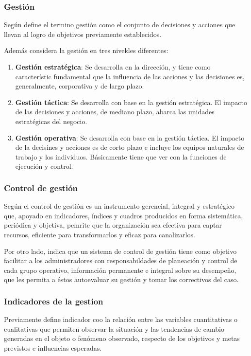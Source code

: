 \subsubsection{Gesti\'on}
Seg\'un \cite{beltran} define el termino gesti\'on como el conjunto de decisiones
y acciones que llevan al logro de objetivos previamente establecidos.

Adem\'as \cite{beltran} considera la gesti\'on en tres nivekles diferentes:
\begin{enumerate}
    \item \textbf{Gesti\'on estrat\'egica}: Se desarrolla en la direcci\'on, y tiene como
          caracter\'istic fundamental que la influencia de las acciones y las decisiones
          es, generalmente, corporativa y de largo plazo.
    \item \textbf{Gesti\'on t\'actica}: Se desarrolla con base en la gesti\'on
          estrat\'egica. El impacto de las decisiones y acciones, de mediano plazo,
          abarca las unidades estrat\'egicas del negocio.
    \item \textbf{Gesti\'on operativa}: Se desarrolla con base en la gesti\'on
          t\'actica. El impacto de la decisines y acciones es de corto plazo e incluye
          los equipos naturales de trabajo y los individuos. B\'asicamente tiene
          que ver con la funciones de ejecuci\'on y control.
\end{enumerate}
\subsubsection{Control de gesti\'on}
Seg\'un \cite{beltran} el control de gesti\'on es un instrumento gerencial, integral
y estrat\'egico que, apoyado en indicadores, \'indices y cuadros producidos en forma
sistem\'atica, peri\'odica y objetiva, pemrite que la organizaci\'on sea efectiva para
captar recursos, eficiente para transformarlos y eficaz para canalizarlos.

Por otro lado, \cite{beltran} indica que un sistema de control de gesti\'on tiene
como objetivo facilitar a los administradores con responsabildades de planeaci\'on
y control de cada grupo operativo, informaci\'on permanente e integral sobre su desempe\~no,
que les permita a \'estos autoevaluar su gesti\'on y tomar los correctivos del caso.

\subsubsection{Indicadores de la gestion}
Previamente \cite{beltran} define indicador coo la relaci\'on entre las variables
cuantitativas o cualitativas que permiten observar la situaci\'on y las tendencias
de cambio generadas en el objeto o fen\'omeno observado, respecto de los objetivos
y metas previstos e influencias esperadas.

